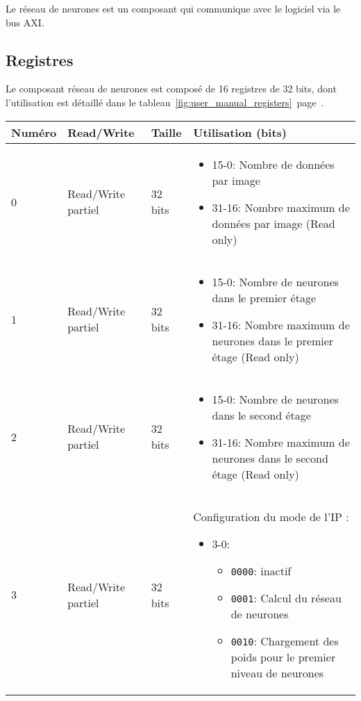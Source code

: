 
Le réseau de neurones est un composant qui communique avec le logiciel
via le bus AXI.

\subsection{Registres}

Le composant réseau de neurones est composé de 16 registres de 32 bits,
dont l'utilisation est détaillé dans le
tableau~\ref{fig:user_manual_registers}~page~\pageref{fig:user_manual_registers}.

\begin{longtable}{| p{} | p{} | p{} | p{} |}
	\hline
	Numéro & Read/Write & Taille & Utilisation (bits)\\ \hline
	0 & Read/Write partiel & 32 bits &
	\begin{itemize}
		\item 15-0: Nombre de données par image
		\item 31-16: Nombre maximum de données par image (Read only)
	\end{itemize}\\ \hline
	1 & Read/Write partiel & 32 bits &
	\begin{itemize}
		\item 15-0: Nombre de neurones dans le premier étage
		\item 31-16: Nombre maximum de neurones dans le premier étage (Read only)
	\end{itemize}\\ \hline
	2 & Read/Write partiel & 32 bits &
	\begin{itemize}
		\item 15-0: Nombre de neurones dans le second étage
		\item 31-16: Nombre maximum de neurones dans le second étage (Read only)
	\end{itemize}\\ \hline
	3 & Read/Write partiel & 32 bits &
	Configuration du mode de l'IP :
	\begin{itemize}
		\item 3-0: \begin{itemize}
				\item \verb+0000+: inactif
				\item \verb+0001+: Calcul du réseau de neurones
				\item \verb+0010+: Chargement des poids pour le premier niveau de neurones

\end{itemize}
\end{itemize}
\end{longtable}
